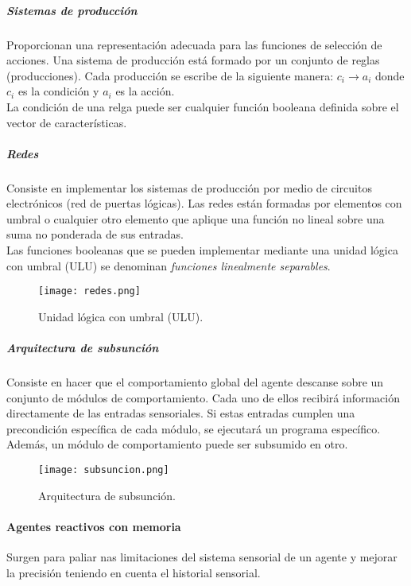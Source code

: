 \documentclass[12pt,spanish]{article}
\numberwithin{definition}{subsection}
\begin{document}
\subparagraph{Sistemas de producción}

Proporcionan una representación adecuada para las funciones de selección de acciones. Una sistema de producción está formado por un conjunto de reglas (producciones). Cada producción se escribe de la siguiente manera: $c_i \rightarrow a_i$ donde $c_i$ es la condición y $a_i$ es la acción.\\

La condición de una relga puede ser cualquier función booleana definida sobre el vector de características. 

\subparagraph{Redes}

Consiste en implementar los sistemas de producción por medio de circuitos electrónicos (red de puertas lógicas). Las redes están formadas por elementos con umbral o cualquier otro elemento que aplique una función no lineal sobre una suma no ponderada de sus entradas. \\

Las funciones booleanas que se pueden implementar mediante una unidad lógica con umbral (ULU) se denominan \emph{funciones linealmente separables}.

\begin{figure}[H]
\centering
\texttt{[image: redes.png]}
\caption{Unidad lógica con umbral (ULU).}
\end{figure}

\subparagraph{Arquitectura de subsunción}

Consiste en hacer que el comportamiento global del agente descanse sobre un conjunto de módulos de comportamiento. Cada uno de ellos recibirá información directamente de las entradas sensoriales. Si estas entradas cumplen una precondición específica de cada módulo, se ejecutará un programa específico. Además, un módulo de comportamiento puede ser subsumido en otro.

\begin{figure}[H]
\centering
\texttt{[image: subsuncion.png]}
\caption{Arquitectura de subsunción.}
\end{figure}

\paragraph{Agentes reactivos con memoria}

Surgen para paliar nas limitaciones del sistema sensorial de un agente y mejorar la precisión teniendo en cuenta el historial sensorial.\\
\end{document}
